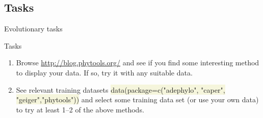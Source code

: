 \documentclass[compress, xelatex, 11pt, xcolor=svgnames, aspectratio=169,
	hyperref={
		bookmarks=true,
		unicode=true,
		colorlinks=true,
		pdftitle={Molecular data in R},
		plainpages=false,
		pdfauthor={Vojtech Zeisek},
		pdfsubject={Course about phylogeny and evolution in R},
		pdfcreator={XeLaTeX},
		pdfkeywords={R, evolution, phylogeny, molecular data},
		linkcolor=Crimson, %
		anchorcolor=Magenta, %
		citecolor=Magenta, %
		filecolor=Magenta, %
		menucolor=Magenta, %
		urlcolor=DodgerBlue, %
		},
	url={hyphens, lowtilde} %
	]{beamer}
\renewcommand{\texttt}[1]{\colorbox{Beige}{{\ttfamily #1}}}
\begin{document}
%
%

\subsection{Tasks}

\begin{frame}{Evolutionary tasks}
	\begin{exampleblock}{Tasks}
		\begin{enumerate}
			\item Browse \url{http://blog.phytools.org/} and see if you find some interesting method to display your data. If so, try it with any suitable data.
			\item See relevant training datasets \texttt{data(package=c("adephylo", "caper", "geiger","phytools"))} and select some training data set (or use your own data) to try at least 1--2 of the above methods.
		\end{enumerate}
	\end{exampleblock}
\end{frame}

\section{}
\end{document}
